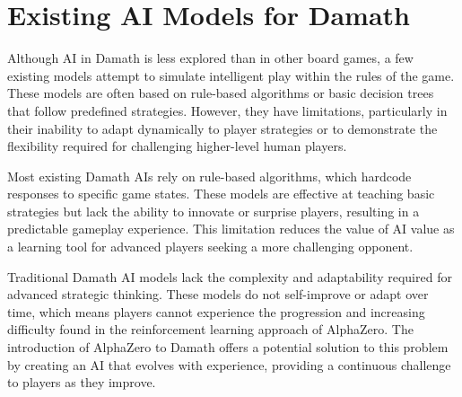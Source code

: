 \section{Existing AI Models for Damath}

Although AI in Damath is less explored than in other board games, a few existing models attempt to simulate intelligent play within the rules of the game. These models are often based on rule-based algorithms or basic decision trees that follow predefined strategies. However, they have limitations, particularly in their inability to adapt dynamically to player strategies or to demonstrate the flexibility required for challenging higher-level human players.

Most existing Damath AIs rely on rule-based algorithms, which hardcode responses to specific game states. These models are effective at teaching basic strategies but lack the ability to innovate or surprise players, resulting in a predictable gameplay experience. This limitation reduces the value of AI value as a learning tool for advanced players seeking a more challenging opponent.

Traditional Damath AI models lack the complexity and adaptability required for advanced strategic thinking. These models do not self-improve or adapt over time, which means players cannot experience the progression and increasing difficulty found in the reinforcement learning approach of AlphaZero. The introduction of AlphaZero to Damath offers a potential solution to this problem by creating an AI that evolves with experience, providing a continuous challenge to players as they improve.
